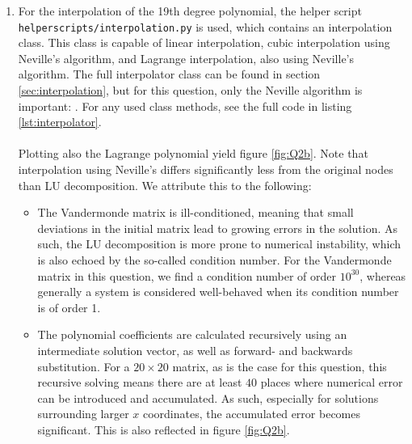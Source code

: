 \begin{enumerate}[label=(\alph*)]
\noindent
With a solution for $\bvec{c}$, a polynomial on 1000 equally-spaced points is created using

Plotting the polynomial, as well as the original nodes, yields figure \ref{fig:Q2a}
\begin{figure}[H]
    \centering
    \texttt{[image: ../figures/02\_vandermonde\_Q2a.png]}
    \caption{Polynomial found using LU decomposition of the Vandermonde matrix. Notice how the absolute difference with the initial points $y_i$ starts small, but grows for points at more positive $x$.}
    \label{fig:Q2a}
\end{figure}

\item For the interpolation of the 19th degree polynomial, the helper script \texttt{helperscripts/interpolation.py} is used, which contains an interpolation class. This class is capable of linear interpolation, cubic interpolation using Neville's algorithm, and Lagrange interpolation, also using Neville's algorithm. The full interpolator class can be found in section \ref{sec:interpolation}, but for this question, only the Neville algorithm is important:
.
For any used class methods, see the full code in listing \ref{lst:interpolator}.\\
\\
Plotting also the Lagrange polynomial yield figure \ref{fig:Q2b}. Note that interpolation using Neville's differs significantly less from the original nodes than LU decomposition. We attribute this to the following:
\begin{itemize}
    \item The Vandermonde matrix is ill-conditioned, meaning that small deviations in the initial matrix lead to growing errors in the solution. As such, the LU decomposition is more prone to numerical instability, which is also echoed by the so-called condition number. For the Vandermonde matrix in this question, we find a condition number of order $10^30$, whereas generally a system is considered well-behaved when its condition number is of order 1. 
\item The polynomial coefficients are calculated recursively using an intermediate solution vector, as well as forward- and backwards substitution. For a $20\times20$ matrix, as is the case for this question, this recursive solving means there are at least $40$ places where numerical error can be introduced and accumulated. As such, especially for solutions surrounding larger $x$ coordinates, the accumulated error becomes significant. This is also reflected in figure \ref{fig:Q2b}.
\end{itemize}


\end{enumerate}
